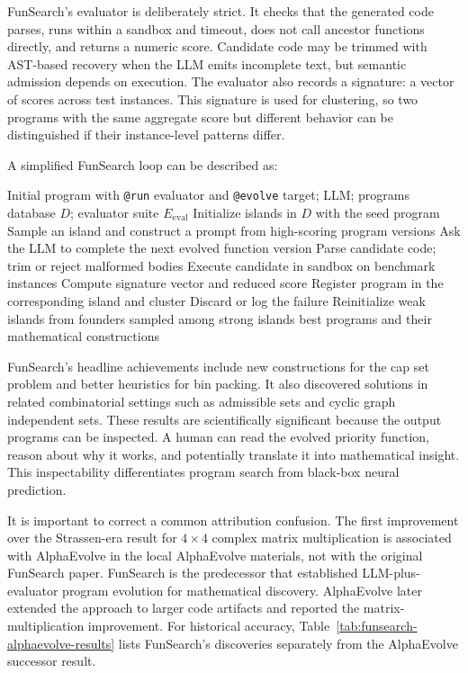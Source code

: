 FunSearch's evaluator is deliberately strict.  It checks that the generated code parses, runs within a sandbox and timeout, does not call ancestor functions directly, and returns a numeric score.  Candidate code may be trimmed with AST-based recovery when the LLM emits incomplete text, but semantic admission depends on execution.  The evaluator also records a signature: a vector of scores across test instances.  This signature is used for clustering, so two programs with the same aggregate score but different behavior can be distinguished if their instance-level patterns differ.

A simplified FunSearch loop can be described as:
\begin{algorithm}[t]
\caption{FunSearch-style program evolution}
\label{alg:funsearch-style}
\begin{algorithmic}[1]
\REQUIRE Initial program with \texttt{@run} evaluator and \texttt{@evolve} target; LLM; programs database $D$; evaluator suite $E_{\mathrm{eval}}$
\STATE Initialize islands in $D$ with the seed program
  \STATE Sample an island and construct a prompt from high-scoring program versions
  \STATE Ask the LLM to complete the next evolved function version
  \STATE Parse candidate code; trim or reject malformed bodies
  \STATE Execute candidate in sandbox on benchmark instances
    \STATE Compute signature vector and reduced score
    \STATE Register program in the corresponding island and cluster
  \ELSE
    \STATE Discard or log the failure
  \ENDIF
    \STATE Reinitialize weak islands from founders sampled among strong islands
  \ENDIF
\ENDWHILE
\RETURN best programs and their mathematical constructions
\end{algorithmic}
\end{algorithm}

FunSearch's headline achievements include new constructions for the cap set problem and better heuristics for bin packing.  It also discovered solutions in related combinatorial settings such as admissible sets and cyclic graph independent sets.  These results are scientifically significant because the output programs can be inspected.  A human can read the evolved priority function, reason about why it works, and potentially translate it into mathematical insight.  This inspectability differentiates program search from black-box neural prediction.

It is important to correct a common attribution confusion.  The first improvement over the Strassen-era result for $4\times4$ complex matrix multiplication is associated with AlphaEvolve in the local AlphaEvolve materials, not with the original FunSearch paper.  FunSearch is the predecessor that established LLM-plus-evaluator program evolution for mathematical discovery.  AlphaEvolve later extended the approach to larger code artifacts and reported the matrix-multiplication improvement.  For historical accuracy, Table~\ref{tab:funsearch-alphaevolve-results} lists FunSearch's discoveries separately from the AlphaEvolve successor result.

